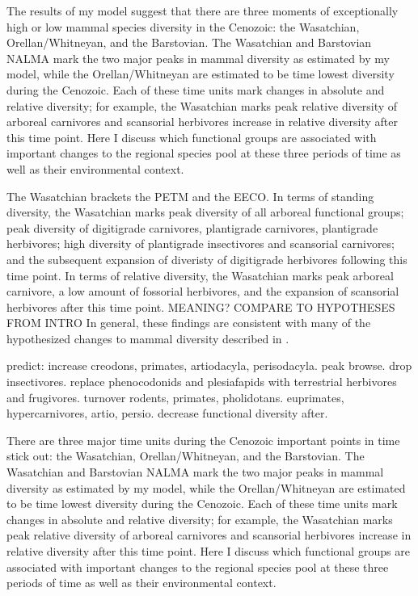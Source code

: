 \documentclass[12pt,letterpaper]{article}
\begin{document}
The results of my model suggest that there are three moments of exceptionally high or low mammal species diversity in the Cenozoic: the Wasatchian, Orellan/Whitneyan, and the Barstovian. The Wasatchian and Barstovian NALMA mark the two major peaks in mammal diversity as estimated by my model, while the Orellan/Whitneyan are estimated to be time lowest diversity during the Cenozoic. Each of these time units mark changes in absolute and relative diversity; for example, the Wasatchian marks peak relative diversity of arboreal carnivores and scansorial herbivores increase in relative diversity after this time point. Here I discuss which functional groups are associated with important changes to the regional species pool at these three periods of time as well as their environmental context.


The Wasatchian brackets the PETM and the EECO. In terms of standing diversity, the Wasatchian marks peak diversity of all arboreal functional groups; peak diversity of digitigrade carnivores, plantigrade carnivores, plantigrade herbivores; high diversity of plantigrade insectivores and scansorial carnivores; and the subsequent expansion of diveristy of digitigrade herbivores following this time point. In terms of relative diversity, the Wasatchian marks peak arboreal carnivore, a low amount of fossorial herbivores, and the expansion of scansorial herbivores after this time point. \uppercase{meaning? compare to hypotheses from intro}
In general, these findings are consistent with many of the hypothesized changes to mammal diversity described in \citet{Woodburne2009}.


predict: increase creodons, primates, artiodacyla, perisodacyla. peak browse. drop insectivores. replace phenocodonids and plesiafapids with terrestrial herbivores and frugivores. turnover rodents, primates, pholidotans. euprimates, hypercarnivores, artio, persio. decrease functional diversity after.



There are three major time units during the Cenozoic important points in time stick out: the Wasatchian, Orellan/Whitneyan, and the Barstovian. The Wasatchian and Barstovian NALMA mark the two major peaks in mammal diversity as estimated by my model, while the Orellan/Whitneyan are estimated to be time lowest diversity during the Cenozoic. Each of these time units mark changes in absolute and relative diversity; for example, the Wasatchian marks peak relative diversity of arboreal carnivores and scansorial herbivores increase in relative diversity after this time point. Here I discuss which functional groups are associated with important changes to the regional species pool at these three periods of time as well as their environmental context.
\end{document}
